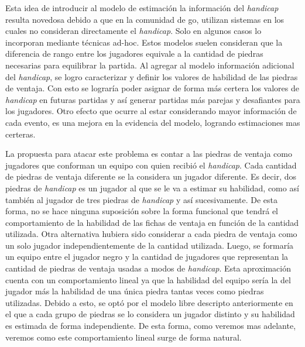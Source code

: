 \documentclass[11pt,twoside,spanish]{report} %
\begin{document}
Esta idea de introducir al modelo de estimaci\'on la informaci\'on del \textit{handicap} resulta novedosa debido a que en la comunidad de go, utilizan sistemas en los cuales no consideran directamente el \emph{handicap}.
Solo en algunos casos lo incorporan mediante t\'ecnicas ad-hoc.
Estos modelos suelen consideran que la diferencia de rango entre los jugadores equivale a la cantidad de piedras necesarias para equilibrar la partida.
Al agregar al modelo informaci\'on adicional del \textit{handicap}, se logro caracterizar y definir los valores de habilidad de las piedras de ventaja.
Con esto se lograr\'ia poder asignar de forma m\'as certera los valores de \textit{handicap} en futuras partidas y as\'i generar partidas  m\'as parejas y desafiantes para los jugadores.
Otro efecto que ocurre al estar considerando mayor informaci\'on de cada evento, es una mejora en la evidencia del modelo, logrando estimaciones mas certeras.




La propuesta para atacar este problema es contar a las piedras de ventaja como jugadores que conforman un equipo con quien recibi\'o el \emph{handicap}.
Cada cantidad de piedras de ventaja diferente se la considera un jugador diferente.
Es decir, dos piedras de \textit{handicap} es un jugador al que se le va a estimar su habilidad, como as\'i tambi\'en al jugador de tres piedras de \textit{handicap} y as\'i sucesivamente.
De esta forma, no se hace ninguna suposici\'on sobre la forma funcional que tendr\'a el comportamiento de la habilidad de las fichas de ventaja en funci\'on de la cantidad utilizada.
Otra alternativa hubiera sido considerar a cada piedra de ventaja como un solo jugador independientemente de la cantidad utilizada. 
Luego, se formar\'ia un equipo entre el jugador negro y la cantidad de jugadores que representan la cantidad de piedras de ventaja usadas a modos de \textit{handicap}.
Esta aproximaci\'on cuenta con un comportamiento lineal ya que la habilidad del equipo ser\'ia la del jugador m\'as la habilidad de una \'unica piedra tantas veces como piedras utilizadas.
Debido a esto, se opt\'o por el modelo libre descripto anteriormente en el que a cada grupo de piedras se lo considera un jugador distinto y su habilidad es estimada de forma independiente.
De esta forma, como veremos mas adelante, veremos como este comportamiento lineal surge de forma natural.
\end{document}
